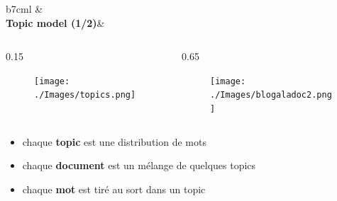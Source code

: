 \documentclass[12pt]{beamer}
\begin{document}
\begin{frame}
\begin{tabular}{b{7cm}l}
& \\ {\large \textbf{Topic model (1/2)}}& 
\end{tabular}
\begin{columns}

\begin{column}{0.15\linewidth}
\centering
\begin{figure}
\texttt{[image: ./Images/topics.png]}
\end{figure}
\end{column}

\begin{column}{0.65\linewidth}
\centering
\begin{figure}
\texttt{[image: ./Images/blogaladoc2.png]}
\end{figure}
\end{column}

\end{columns}

\vspace{0.3cm}

\begin{itemize}
\item chaque \textbf{topic} est une distribution de mots
\pause
\item chaque \textbf{document} est un mélange de quelques topics
\pause
\item chaque \textbf{mot} est tiré au sort dans un topic
\end{itemize}
\end{frame}
\end{document}
